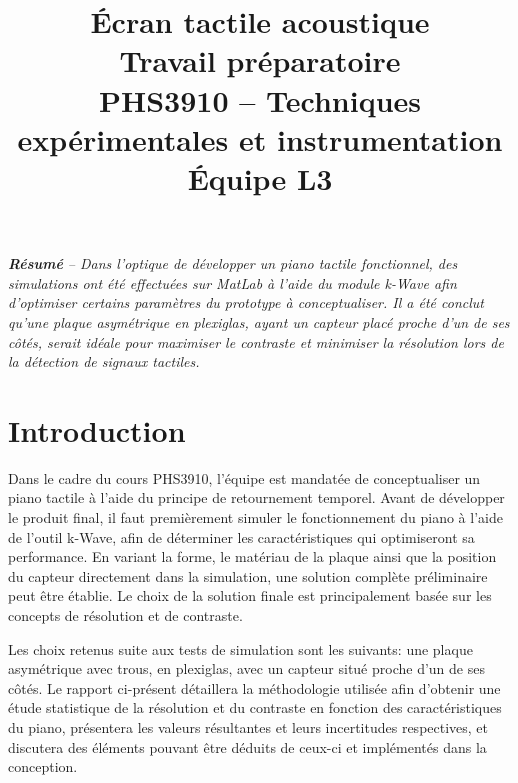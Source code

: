 \documentclass[conference]{IEEEtran}
\begin{document}
\title{Écran tactile acoustique\\
\large Travail préparatoire \\
PHS3910 -- Techniques expérimentales et instrumentation\\ 
Équipe L3}

\author{
\and
{}
\and
{}
\and
{}
}

\maketitle

\textit{\textbf{Résumé} -- Dans l'optique de développer un piano tactile fonctionnel,
des simulations ont été effectuées sur MatLab à l'aide du module k-Wave afin d'optimiser
certains paramètres du prototype à conceptualiser. Il a été conclut qu'une plaque asymétrique en plexiglas, ayant %
un capteur placé proche d'un de ses côtés, serait idéale pour maximiser le contraste et minimiser la résolution 
lors de la détection de signaux tactiles.}


\section{Introduction}
Dans le cadre du cours PHS3910, l'équipe est mandatée de conceptualiser
un piano tactile à l'aide du principe de retournement temporel. Avant
de développer le produit final, il faut premièrement simuler le fonctionnement 
du piano à l'aide de l'outil k-Wave, afin de déterminer les caractéristiques qui 
optimiseront sa performance. En variant la forme, le matériau de 
la plaque ainsi que la position du capteur directement dans la simulation,
une solution complète préliminaire peut être établie. Le choix de la solution finale est
principalement basée sur les concepts de résolution et de contraste.

Les choix retenus suite aux tests de simulation sont les suivants: une plaque
asymétrique avec trous, en plexiglas, avec un capteur situé proche d'un de ses côtés.
Le rapport ci-présent détaillera la méthodologie utilisée afin d'obtenir 
une étude statistique de la résolution et du contraste en fonction des
caractéristiques du piano, présentera les valeurs résultantes et leurs incertitudes 
respectives, et discutera des éléments pouvant être déduits de ceux-ci et implémentés 
dans la conception.
\end{document}
